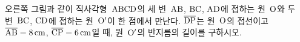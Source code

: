 \noindent\begin{minipage}[t]{0.58\linewidth}\vspace{0pt}\raggedright 오른쪽 그림과 같이 직사각형~$\mathrm{ABCD}$의 세 변~$\mathrm{AB}$, $\mathrm{BC}$, $\mathrm{AD}$에 접하는 원~$\mathrm{O}$와 두 변~$\mathrm{BC}$, $\mathrm{CD}$에 접하는 원~$\mathrm{O'}$이 한 점에서 만난다. $\overline{\mathrm{DP}}$는 원~$\mathrm{O}$의 접선이고 $\overline{\mathrm{AB}}=8\,\mathrm{cm}$, $\overline{\mathrm{CP}}=6\,\mathrm{cm}$일 때, 원~$\mathrm{O'}$의 반지름의 길이를 구하시오.\end{minipage}\hfill\begin{minipage}[t]{0.4\linewidth}\vspace{0pt}\centering \resizebox{\ifdim\width>\linewidth\linewidth\else\width\fi}{!}{}\end{minipage}\par
